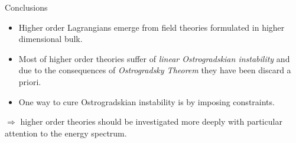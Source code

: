 \begin{frame}{Conclusions}
  \begin{itemize}
    \item Higher order Lagrangians emerge from field theories formulated in
      higher dimensional bulk. \vspace{0.5em}
    \item Most of higher order theories suffer of \emph{linear Ostrogradskian
      instability} and due to the consequences of \emph{Ostrogradsky Theorem}
      they have been discard a priori. \vspace{0.5em}
    \item One way to cure Ostrogradskian instability is by imposing
      constraints.
  \end{itemize} \vspace{1.0em}
  $\Rightarrow$ higher order theories should be investigated more
  deeply with particular attention to the energy spectrum.
\end{frame}
